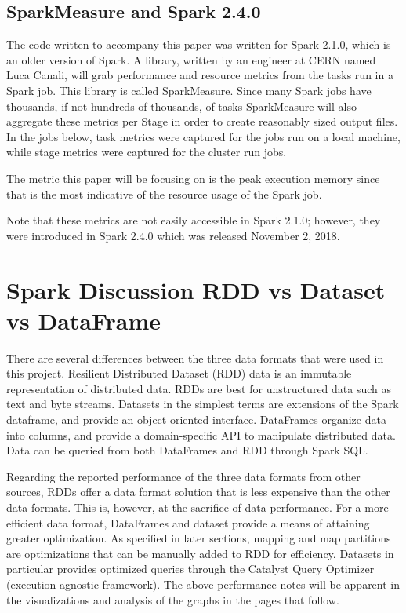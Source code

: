 \documentclass[conference]{IEEEtran}
\begin{document}
\subsection{SparkMeasure and Spark 2.4.0}
The code written to accompany this paper was written for Spark 2.1.0, which is an older version of Spark.
A library, written by an engineer at CERN named Luca Canali, will grab performance and resource metrics from the tasks run in a Spark job.
This library is called SparkMeasure. \cite{b8}
Since many Spark jobs have thousands, if not hundreds of thousands, of tasks SparkMeasure will also aggregate these metrics per Stage in order to create reasonably sized output files.
In the jobs below, task metrics were captured for the jobs run on a local machine, while stage metrics were captured for the cluster run jobs.

The metric this paper will be focusing on is the peak execution memory since that is the most indicative of the resource usage of the Spark job.

Note that these metrics are not easily accessible in Spark 2.1.0; however, they were introduced in Spark 2.4.0 which was released November 2, 2018. \cite{b9}

\section{Spark Discussion RDD vs Dataset vs DataFrame}

There are several differences between the three data formats that were used in this project.
Resilient Distributed Dataset (RDD) data is an immutable representation of distributed data.
RDDs are best for unstructured data such as text and byte streams.
Datasets in the simplest terms are extensions of the Spark dataframe, and provide an object oriented interface.
DataFrames organize data into columns, and provide a domain-specific API to manipulate distributed data.
Data can be queried from both DataFrames and RDD through Spark SQL.\cite{b1}

Regarding the reported performance of the three data formats from other sources,
RDDs offer a data format solution that is less expensive than the other data formats.
This is, however, at the sacrifice of data performance. For a more efficient data format, DataFrames and dataset provide
a means of attaining greater optimization.\cite{b3}
As specified in later sections, mapping and map partitions are optimizations that can be manually added to RDD
for efficiency.
Datasets in particular provides optimized queries through the Catalyst Query Optimizer (execution agnostic framework).
The above performance notes will be apparent in the visualizations and analysis of the graphs in the pages that follow.
\end{document}
